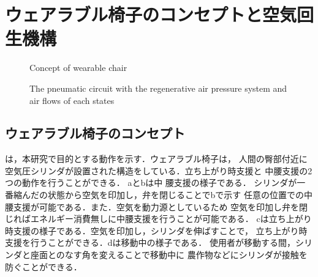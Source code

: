 \section{ウェアラブル椅子のコンセプトと空気回生機構}
\begin{figure}[h]%
        \begin{center}%
         \caption{Concept of wearable chair}%
         \vspace{-5mm}
        \end{center}%
       \end{figure}%
\begin{figure}[h]%
        \begin{center}%
         \caption{The pneumatic circuit with the regenerative air
         pressure system  and air flows of each states}%
         \vspace{-8mm}
        \end{center}%
\end{figure}%
\subsection{ウェアラブル椅子のコンセプト}
は，本研究で目的とする動作を示す．ウェアラブル椅子は，
人間の臀部付近に空気圧シリンダが設置された構造をしている．立ち上がり時支援と
中腰支援の2つの動作を行うことができる．
aとbは中
腰支援の様子である．
シリンダが一番縮んだの状態から空気を印加し，弁を閉じることでbで示す
任意の位置での中腰支援が可能である．また．空気を動力源としているため
空気を印加し弁を閉じればエネルギー消費無しに中腰支援を行うことが可能である．
cは立ち上がり時支援の様子である．空気を印加し，シリンダを伸ばすことで，
立ち上がり時支援を行うことができる．dは移動中の様子である．
使用者が移動する間，シリンダと座面とのなす角を変えることで移動中に
農作物などにシリンダが接触を防ぐことができる．
